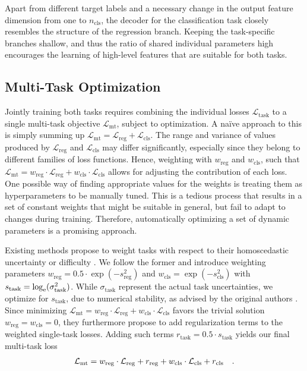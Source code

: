 \documentclass[lang=english]{tumarxivarticle}
\newcommand{\citep}{\parencite}
\newcommand{\loss}{\ensuremath{\mathcal{L}}}
\begin{document}
Apart from different target labels and a necessary change in the output feature dimension from one to $n_\text{cls}$, the decoder for the classification task closely resembles the structure of the regression branch.
Keeping the task-specific branches shallow, and thus the ratio of shared \vs individual parameters high encourages the learning of high-level features that are suitable for both tasks.


\subsection{Multi-Task Optimization}
\label{subsec:multi_task}

Jointly training both tasks requires combining the individual losses $\loss_\text{task}$ to a single multi-task objective $\loss_\text{mt}$, subject to optimization.
A na\"ive approach to this is simply summing up $\loss_\text{mt} = \loss_\text{reg} + \loss_\text{cls}$.
The range and variance of values produced by $\loss_\text{reg}$ and $\loss_\text{cls}$ may differ significantly, especially since they belong to different families of loss functions.
Hence, weighting with $w_\text{reg}$ and $w_\text{cls}$, such that $\loss_\text{mt} = w_\text{reg} \cdot \loss_\text{reg} + w_\text{cls} \cdot \loss_\text{cls}$ allows for adjusting the contribution of each loss.
One possible way of finding appropriate values for the weights is treating them as hyperparameters to be manually tuned.
This is a tedious process that results in a set of constant weights that might be suitable in general, but fail to adapt to changes during training.
Therefore, automatically optimizing a set of dynamic parameters is a promising approach.

Existing methods propose to weight tasks with respect to their homoscedastic uncertainty \citep{Kendall18} or difficulty \citep{Guo18}.
We follow the former and introduce weighting parameters $w_\text{reg} = 0.5 \cdot \exp(-s_\text{reg}^2)$ and $w_\text{cls} = \exp(-s_\text{cls}^2)$ with $s_\text{task} = \log_{\mathrm{e}}(\sigma_\text{task}^2)$.
While $\sigma_\text{task}$ represent the actual task uncertainties, we optimize for $s_\text{task}$, due to numerical stability, as advised by the original authors \citep{Kendall18}.
Since minimizing $\loss_\text{mt} = w_\text{reg} \cdot \loss_\text{reg} + w_\text{cls} \cdot \loss_\text{cls}$ favors the trivial solution $w_\text{reg} = w_\text{cls} = 0$, they furthermore propose to add regularization terms to the weighted single-task losses.
Adding such terms $r_\text{task} = 0.5 \cdot s_\text{task}$ yields our final multi-task loss
\begin{align}
  \loss_\text{mt} = w_\text{reg} \cdot \loss_\text{reg} + r_\text{reg} + w_\text{cls} \cdot \loss_\text{cls} + r_\text{cls} \text{\quad .}
  \label{eq:mt_loss}
\end{align}
\end{document}

